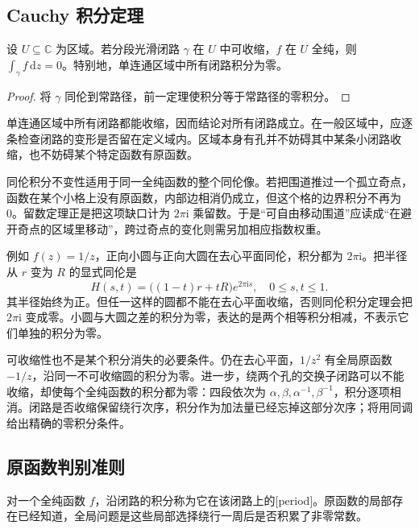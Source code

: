 \subsection{Cauchy 积分定理}
\label{b3:subsec:100202}

\begin{corollary}\label{b3:cor:10-null-homotopic-cauchy}
设 \(U\subseteq\mathbb C\) 为区域。若分段光滑闭路 \(\gamma\) 在 \(U\) 中可收缩，\(f\) 在 \(U\) 全纯，则 \(\int_\gamma f\,\mathrm{d}z=0\)。特别地，单连通区域中所有闭路积分为零。
\end{corollary}
\begin{proof}
将 \(\gamma\) 同伦到常路径，前一定理使积分等于常路径的零积分。
\end{proof}
单连通区域中所有闭路都能收缩，因而结论对所有闭路成立。在一般区域中，应逐条检查闭路的变形是否留在定义域内。区域本身有孔并不妨碍其中某条小闭路收缩，也不妨碍某个特定函数有原函数。

\ProseParagraphBreak
同伦积分不变性适用于同一全纯函数的整个同伦像。若把围道推过一个孤立奇点，函数在某个小格上没有原函数，内部边相消仍成立，但这个格的边界积分不再为0。留数定理正是把这项缺口计为 \(2\pi\mathrm{i}\) 乘留数。于是“可自由移动围道”应读成“在避开奇点的区域里移动”，跨过奇点的变化则需另加相应指数权重。

\ProseParagraphBreak
例如 \(f(z)=1/z\)，正向小圆与正向大圆在去心平面同伦，积分都为 \(2\pi\mathrm{i}\)。把半径从 \(r\) 变为 \(R\) 的显式同伦是
\[
 H(s,t)=\bigl((1-t)r+tR\bigr)e^{2\pi\mathrm{i}s},
 \quad 0\le s,t\le1.
\]
其半径始终为正。但任一这样的圆都不能在去心平面收缩，否则同伦积分定理会把 \(2\pi\mathrm{i}\) 变成零。小圆与大圆之差的积分为零，表达的是两个相等积分相减，不表示它们单独的积分为零。

\ProseParagraphBreak
可收缩性也不是某个积分消失的必要条件。仍在去心平面，\(1/z^2\) 有全局原函数 \(-1/z\)，沿同一不可收缩圆的积分为零。进一步，绕两个孔的交换子闭路可以不能收缩，却使每个全纯函数的积分都为零：四段依次为 \(\alpha,\beta,\alpha^{-1},\beta^{-1}\)，积分逐项相消。闭路是否收缩保留绕行次序，积分作为加法量已经忘掉这部分次序；将用同调给出精确的零积分条件。

\subsection{原函数判别准则}
\label{b3:subsec:100203}

对一个全纯函数 \(f\)，沿闭路的积分称为它在该闭路上的[period]。原函数的局部存在已经知道，全局问题是这些局部选择绕行一周后是否积累了非零常数。

